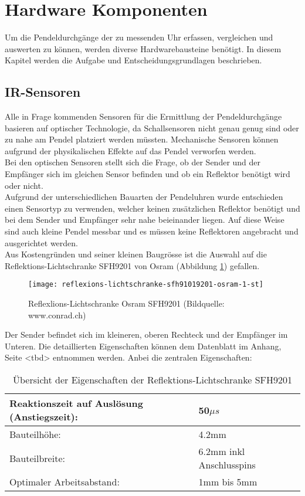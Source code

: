 \section{Hardware Komponenten}
Um die Pendeldurchgänge der zu messenden Uhr erfassen, vergleichen und auswerten zu können, werden diverse Hardwarebausteine benötigt. In diesem Kapitel werden die Aufgabe und Entscheidungsgrundlagen beschrieben.
%
%
\subsection{IR-Sensoren}
\label{cap:sensoren}
	Alle in Frage kommenden Sensoren für die Ermittlung der Pendeldurchgänge basieren auf optischer Technologie, da Schallsensoren nicht genau genug sind oder zu nahe am Pendel platziert werden müssten. Mechanische Sensoren können aufgrund der physikalischen Effekte auf das Pendel verworfen werden.\\
	 Bei den optischen Sensoren stellt sich die Frage, ob der Sender und der Empfänger sich im gleichen Sensor befinden und ob ein Reflektor benötigt wird oder nicht.\\
	Aufgrund der unterschiedlichen Bauarten der Pendeluhren wurde entschieden einen Sensortyp zu verwenden, welcher keinen zusätzlichen Reflektor benötigt und bei dem Sender und Empfänger sehr nahe beieinander liegen. Auf diese Weise sind auch kleine Pendel messbar und es müssen keine Reflektoren angebracht und ausgerichtet werden.\\
	Aus Kostengründen und seiner kleinen Baugrösse ist die Auswahl auf die Reflektions-Lichtschranke SFH9201 von Osram (Abbildung \ref{fig:SFH9201}) gefallen.
	\begin{figure}[H]
        \centering
        \texttt{[image: reflexions-lichtschranke-sfh91019201-osram-1-st]}
        \caption{Reflexlions-Lichtschranke Osram SFH9201 (Bildquelle: www.conrad.ch)}
        \label{fig:SFH9201}
    \end{figure}
	\noindent Der Sender befindet sich im kleineren, oberen Rechteck und der Empfänger im Unteren. Die detaillierten Eigenschaften können dem Datenblatt im Anhang, Seite <tbd> entnommen werden. Anbei die zentralen Eigenschaften: %
	\begin{table}[H]
		\begin{tabular}{|p{11cm}|p{4cm}|}\hline
			Reaktionszeit auf Auslösung (Anstiegszeit): & 50$\mu{s}$ \\ \hline
			Bauteilhöhe:								& 4.2mm\\ \hline
			Bauteilbreite:								& 6.2mm inkl Anschlusspins\\ \hline
			Optimaler Arbeitsabstand:					& 1mm bis 5mm \\ \hline
		\end{tabular}
		\caption{Übersicht der Eigenschaften der Reflektions-Lichtschranke SFH9201}
		\label{tab:SFH9201}
	\end{table}
%
%	

